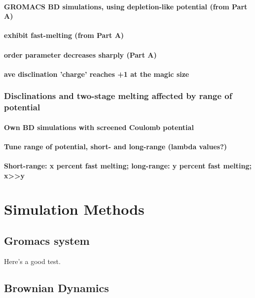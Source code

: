 \documentclass{umthesis}
\begin{document}
\paragraph{GROMACS BD simulations, using depletion-like potential (from Part A)}
\label{sec-2.1.6.1.1}
\paragraph{exhibit fast-melting (from Part A)}
\label{sec-2.1.6.1.2}
\paragraph{order parameter decreases sharply (Part A)}
\label{sec-2.1.6.1.3}
\paragraph{ave disclination 'charge' reaches +1 at the magic size}
\label{sec-2.1.6.1.4}
\subsubsection{Disclinations and two-stage melting affected by range of potential}
\label{sec-2.1.6.2}
\paragraph{Own BD simulations with screened Coulomb potential}
\label{sec-2.1.6.2.1}
\paragraph{Tune range of potential, short- and long-range (lambda values?)}
\label{sec-2.1.6.2.2}
\paragraph{Short-range: x percent fast melting; long-range: y percent fast melting; x>>y}
\label{sec-2.1.6.2.3}
\section{Simulation Methods}
\label{sec-2.2}
\subsection{Gromacs system}
\label{sec-2.2.1}

Here's a good test. \cite{Deng2009}
\subsection{Brownian Dynamics}
\label{sec-2.2.2}
\end{document}
